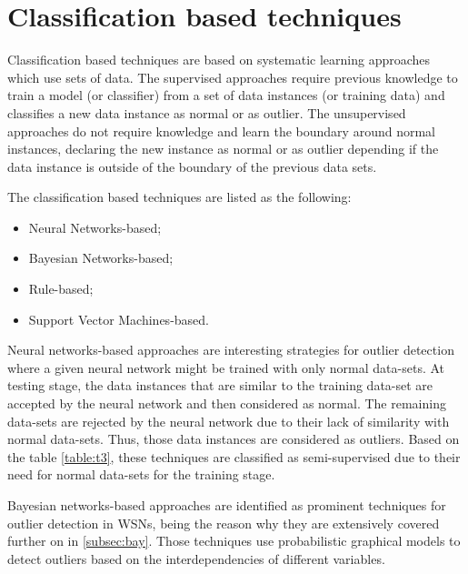 
\newpage

\section{Classification based techniques}
\label{sec:classbased}

Classification based techniques are based on systematic learning approaches which use sets of data. 
The supervised approaches require previous knowledge to train a model (or classifier) from a set of data instances (or training data) and classifies a new data instance as normal or as outlier. 
The unsupervised approaches do not require knowledge and learn the boundary around normal instances, declaring the new instance as normal or as outlier depending if the data instance is outside of the boundary of the previous data sets.

The classification based techniques are listed as the following:

\begin{itemize}
	\setlength\itemsep{-0.5em}
	\item Neural Networks-based;
	\item Bayesian Networks-based;
	\item Rule-based;
	\item Support Vector Machines-based.
	
\end{itemize}

\vspace{0.5em}

Neural networks-based approaches are interesting strategies for outlier detection where a given neural network might be trained with only normal data-sets. 
At testing stage, the data instances that are similar to the training data-set are accepted by the neural network and then considered as normal. 
The remaining data-sets are rejected by the neural network due to their lack of similarity with normal data-sets. Thus, those data instances are considered as outliers. 
Based on the table \ref{table:t3}, these techniques are classified as semi-supervised due to their need for normal data-sets for the training stage.

\vspace{0.5em}

Bayesian networks-based approaches are identified as prominent techniques for outlier detection in WSNs, being the reason why they are extensively covered further on in \ref{subsec:bay}.
Those techniques use probabilistic graphical models to detect outliers based on the interdependencies of different variables.

